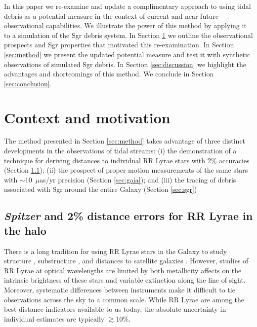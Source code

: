 \documentclass{emulateapj}
\begin{document}
In this paper we re-examine and update a complimentary approach to using tidal debris as a potential measure \citep[originially proposed by][]{johnston99a}  in the context of current and near-future observational capabilities. We illustrate the power of this method by applying it to a simulation of the Sgr debris system.
In Section \ref{sec:context} we outline the observational prospects and Sgr properties that motivated this re-examination.
In Section \ref{sec:method} we present the updated potential measure and test it with synthetic observations of simulated Sgr debris.
In Section \ref{sec:discussion} we highlight the advantages and shortcomings of this method.
We conclude in Section \ref{sec:conclusion}.

%

\section{Context and motivation} \label{sec:context}
The method presented in Section \ref{sec:method} takes advantage of
three distinct developments in the observations of tidal streams: (i)
the demonstration of a technique for deriving distances to individual
RR Lyrae stars with 2\% accuracies (Section \ref{sec:spitzer}); (ii)
the prospect of proper motion measurements of the same stars with
$\sim$10~$\mu$as/yr precision (Section \ref{sec:gaia}); and (iii) the
tracing of debris associated with Sgr around the entire Galaxy
(Section \ref{sec:sgr})

\subsection{{\it Spitzer} and 2\% distance errors for RR Lyrae in the halo}
\label{sec:spitzer}

There is a long tradition for using RR Lyrae stars in the Galaxy to
study structure \citep[going back to first estimates of the distance
  to the Galactic center][]{shapley18}, substructure
\citep[e.g.][]{sesar10}, and distances to satellite galaxies
\citep[e.g.][]{clementini03}.  However, studies of RR Lyrae at optical
wavelengths are limited by both metallicity affects on the intrinsic
brightness of these stars and variable extinction along the line of
sight.  Moreover, systematic differences between instruments make it
difficult to tie observations across the sky to a common scale. While
RR Lyrae are among the best distance indicators available to us today,
the absolute uncertainty in individual estimates are typically
$\gtrsim$10\%.
\end{document}
